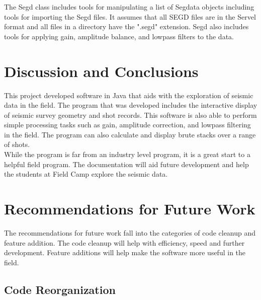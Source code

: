\documentclass[12pt]{article}
\begin{document}
The Segd class includes tools for manipulating a list of Segdata objects including tools for importing the Segd files. It assumes that all SEGD files are in the Servel format and all files in a directory have the ".segd" extension. Segd also includes tools for applying gain, amplitude balance, and lowpass filters to the data. 

\section{Discussion and Conclusions}

This project developed software in Java that aids with the exploration of seismic data in the field. The program that was developed includes the interactive display of seismic survey geometry and shot records. This software is also able to perform simple processing tasks such as gain, amplitude correction, and lowpass filtering in the field. The program can also calculate and display brute stacks over a range of shots.  \\ 

While the program is far from an industry level program, it is a great start to a helpful field program. The documentation will aid future development and help the students at Field Camp explore the seismic data.

\section{Recommendations for Future Work}

The recommendations for future work fall into the categories of code cleanup and feature addition. The code cleanup will help with efficiency, speed and further development. Feature additions will help make the software more useful in the field. 

\subsection{Code Reorganization}
\end{document}

